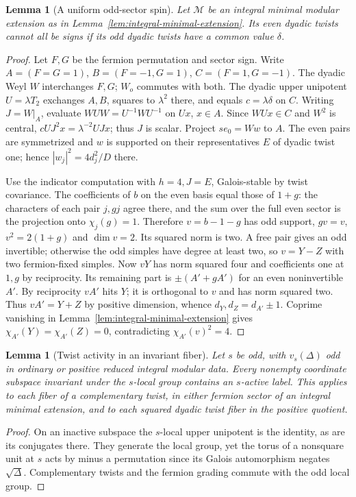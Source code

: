 \documentclass[11pt,a4paper]{article}
\numberwithin{equation}{section}
\newtheorem{lemma}[theorem]{Lemma}
\theoremstyle{remark}
\begin{document}
\begin{lemma}[A uniform odd-sector spin]\label{fam:M:7.7}\label{seq:fermion-one-spin}
Let $\mathcal M$ be an integral minimal modular extension as in
Lemma~\ref{lem:integral-minimal-extension}.
Its even dyadic twists cannot all be signs if its odd dyadic
twists have a common value $\delta$.
\end{lemma}

\begin{proof}
Let $F,G$ be the fermion permutation and sector sign. Write $A=(F=G=1)$, $B=(F=-1,G=1)$, $C=(F=1,G=-1)$. The dyadic Weyl $W$ interchanges $F,G$; $W_o$ commutes with both. The dyadic upper unipotent $U=\lambda T_2$ exchanges $A,B$, squares to $\lambda^2$ there, and equals $c=\lambda\delta$ on $C$. Writing $J=W|_A$, evaluate $WUW=U^{-1}WU^{-1}$ on $Ux$, $x\in A$. Since $WUx\in C$ and $W^2$ is central, $cUJ^2x=\lambda^{-2}UJx$; thus $J$ is scalar. Project $se_0=Ww$ to $A$. The even pairs are symmetrized and $w$ is supported on their representatives $E$ of dyadic twist one; hence $|w_j|^2=4d_j^2/D$ there.

Use the indicator computation with $h=4,J=E$, Galois-stable by twist covariance. The coefficients of $b$ on the even basis equal those of $1+g$: the characters of each pair $j,gj$ agree there, and the sum over the full even sector is the projection onto $\chi_j(g)=1$. Therefore $v=b-1-g$ has odd support, $gv=v$, $v^2=2(1+g)$ and $\dim v=2$. Its squared norm is two. A free pair gives an odd invertible; otherwise the odd simples have degree at least two, so $v=Y-Z$ with two fermion-fixed simples. Now $vY$ has norm squared four and coefficients one at $1,g$ by reciprocity. Its remaining part is $\pm(A'+gA')$ for an even noninvertible $A'$. By reciprocity $vA'$ hits $Y$; it is orthogonal to $v$ and has norm squared two. Thus $vA'=Y+Z$ by positive dimension, whence $d_Y,d_Z=d_{A'}\pm1$. Coprime vanishing in Lemma~\ref{lem:integral-minimal-extension} gives $\chi_{A'}(Y)=\chi_{A'}(Z)=0$, contradicting $\chi_{A'}(v)^2=4$.
\end{proof}

\begin{lemma}[Twist activity in an invariant fiber]\label{fam:M:7.8}\label{lem:odd-valuation-joint-twist}
Let $s$ be odd, with $v_s(\Delta)$ odd in ordinary or positive reduced
integral modular data. Every nonempty coordinate subspace invariant
under the $s$-local group contains an $s$-active label. This applies
to each fiber of a complementary twist, in either fermion sector
of an integral minimal extension, and to each squared dyadic twist
fiber in the positive quotient.
\end{lemma}
\begin{proof}
On an inactive subspace the $s$-local upper unipotent is the identity,
as are its conjugates there. They generate the local group, yet the
torus of a nonsquare unit at $s$ acts by minus a permutation since
its Galois automorphism negates $\sqrt\Delta$. Complementary twists
and the fermion grading commute with the odd local group.
\end{proof}
\end{document}
